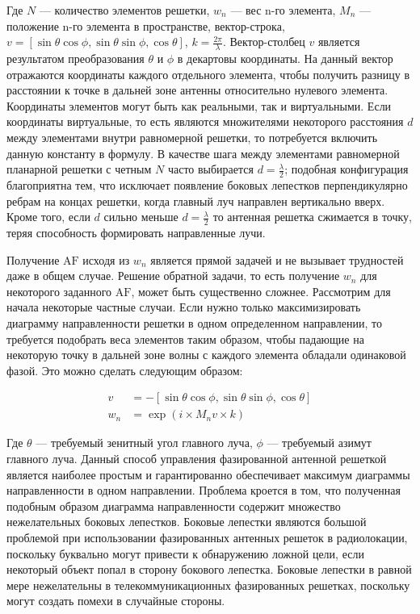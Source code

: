 \documentclass[nonacm, sigconf]{acmart}
\begin{document}
Где $N$ --- количество элементов решетки, $w_n$ --- вес n-го элемента, $M_n$ --- положение n-го элемента в пространстве, вектор-строка, $v = [\sin \theta \cos \phi, \sin \theta \sin \phi, \cos \theta]$, $k = \frac{2\pi}{\lambda}$. Вектор-столбец $v$ является результатом преобразования $\theta$ и $\phi$ в декартовы координаты. На данный вектор отражаются координаты каждого отдельного элемента, чтобы получить разницу в расстоянии к точке в дальней зоне антенны относительно нулевого элемента. Координаты элементов могут быть как реальными, так и виртуальными. Если координаты виртуальные, то есть являются множителями некоторого расстояния $d$ между элементами внутри равномерной решетки, то потребуется включить данную константу в формулу. В качестве шага между элементами равномерной планарной решетки с четным $N$ часто выбирается $d = \frac{\lambda}{2}$; подобная конфигурация благоприятна тем, что исключает появление боковых лепестков перпендикулярно ребрам на концах решетки, когда главный луч направлен вертикально вверх. Кроме того, если $d$ сильно меньше $d = \frac{\lambda}{2}$ то антенная решетка сжимается в точку, теряя способность формировать направленные лучи.

Получение $\text{AF}$ исходя из $w_n$ является прямой задачей и не вызывает трудностей даже в общем случае. Решение обратной задачи, то есть получение $w_n$ для некоторого заданного $\text{AF}$, может быть существенно сложнее. Рассмотрим для начала некоторые частные случаи. Если нужно только максимизировать диаграмму направленности решетки в одном определенном направлении, то требуется подобрать веса элементов таким образом, чтобы падающие на некоторую точку в дальней зоне волны с каждого элемента обладали одинаковой фазой. Это можно сделать следующим образом:

\begin{equation}\label{eq:beamsteer}
\begin{split}
  v & = - [\sin \theta \cos \phi, \sin \theta \sin \phi, \cos \theta] \\
  w_n & = \exp(i \times M_n v \times k)
\end{split}
\end{equation}

Где $\theta$ --- требуемый зенитный угол главного луча, $\phi$ --- требуемый азимут главного луча. Данный способ управления фазированной антенной решеткой является наиболее простым и гарантированно обеспечивает максимум диаграммы направленности в одном направлении. Проблема кроется в том, что полученная подобным образом диаграмма направленности содержит множество нежелательных боковых лепестков. Боковые лепестки являются большой проблемой при использовании фазированных антенных решеток в радиолокации, поскольку буквально могут привести к обнаружению ложной цели, если некоторый объект попал в сторону бокового лепестка. Боковые лепестки в равной мере нежелательны в телекоммуникационных фазированных решетках, поскольку могут создать помехи в случайные стороны.
\end{document}
